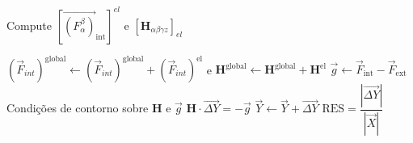 \documentclass{beamer}
\begin{document}
\begin{frame}

    \begin{algorithm}[H]
        \caption{Pseudo-Algoritmo}
        \begin{algorithmic}[1]
            \footnotesize %
                        \State Compute $\left[\vec{(F^\beta_\alpha)}_{\text{int}}\right]^{el}$ \quad e \quad $\left[\mathbf{H} _{\alpha\beta\gamma z}\right]_{el}$
                    \EndFor

                    \State $\left(\vec{F}_{int}\right)^{\text{global}} \gets \left(\vec{F}_{int}\right)^{\text{global}} + \left(\vec{F}_{int}\right)^{\text{el}}$ \quad  e \quad  $\mathbf{H}^{\text{global}} \gets \mathbf{H}^{\text{global}} + \mathbf{H}^{\text{el}}$
                    \State $\vec{g} \gets  \vec{F}_{\text{int}} - \vec{F}_{\text{ext}}$
                    \State Condições de contorno sobre $\mathbf{H}$ e $\vec{g}$ 
                    \State $\mathbf{H} \cdot \vec{\Delta Y} = -\vec{g}$
                    \State $\vec{Y} \gets \vec{Y} + \vec{\Delta Y}$
                    \State $\mathrm{RES} = \dfrac{|\vec{\Delta Y}|}{|\vec{X}|}$
                \EndWhile
            \EndFor
        \end{algorithmic}
    \end{algorithm}
        

\end{frame}
\end{document}
